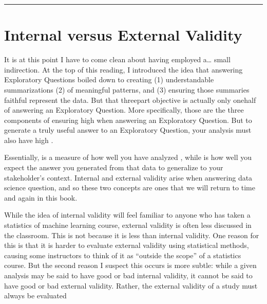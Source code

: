 \documentclass[letterpaper,10pt,english]{jupyterBook}
\begin{document}
\bigskip\hrule\bigskip


\sphinxstepscope


\section{Internal versus External Validity}
\label{\detokenize{30_questions/17_exploratory_questions_internal_external:internal-versus-external-validity}}\label{\detokenize{30_questions/17_exploratory_questions_internal_external::doc}}
\sphinxAtStartPar
It is at this point I have to come clean about having employed a… small indirection. At the top of this reading, I introduced the idea that answering Exploratory Questions boiled down to creating (1) understandable summarizations (2) of meaningful patterns, and (3) ensuring those summaries faithful represent the data. But that three\sphinxhyphen{}part objective is actually only one\sphinxhyphen{}half of answering an Exploratory Question. More specifically, those are the three components of ensuring high  when answering an Exploratory Question. But to generate a truly useful answer to an Exploratory Question, your analysis must also have high .

\sphinxAtStartPar
Essentially,  is a measure of how well you have analyzed , while  is how well you expect the answer you generated from that data to generalize to your stakeholder’s context. Internal and external validity arise when answering  data science question, and so these two concepts are ones that we will return to time and again in this book.

\sphinxAtStartPar
While the idea of internal validity will feel familiar to anyone who has taken a statistics of machine learning course, external validity is often less discussed in the classroom. This is not because it is less  than internal validity. One reason for this is that it is harder to evaluate external validity using statistical methods, causing some instructors to think of it as “outside the scope” of a statistics course. But the second reason I suspect this occurs is more subtle: while a given analysis may be said to have good or bad internal validity, it cannot be said to have good or bad external validity. Rather, the external validity of a study must always be evaluated 
\end{document}
